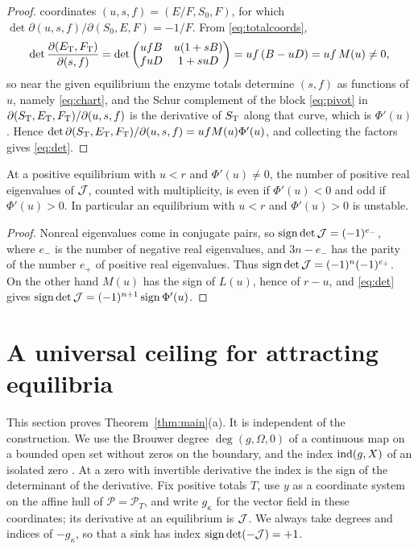 \begin{proof}
coordinates \((u,s,f)=(E/F,S_0,F)\), for which
\(\det\partial(u,s,f)/\partial(S_0,E,F)=-1/F\). From \eqref{eq:totalcoords},
\begin{equation}\label{eq:pivot}
 \det\frac{\partial(E_{\mathrm T},F_{\mathrm T})}{\partial(s,f)}
 =\det\begin{pmatrix}ufB&u(1+sB)\\ fuD&1+suD\end{pmatrix}=uf\,(B-uD)=uf\,M(u)\ne0,
\end{equation}
so near the given equilibrium the enzyme totals determine \((s,f)\) as functions of \(u\),
namely \eqref{eq:chart}, and the Schur complement of the block \eqref{eq:pivot} in
\(\partial(S_{\mathrm T},E_{\mathrm T},F_{\mathrm T})/\partial(u,s,f)\) is the derivative of \(S_{\mathrm T}\) along that curve, which
is \(\Phi'(u)\). Hence \(\det\partial(S_{\mathrm T},E_{\mathrm T},F_{\mathrm T})/\partial(u,s,f)=ufM(u)\Phi'(u)\), and
collecting the factors gives \eqref{eq:det}.
\end{proof}

\begin{corollary}\label{cor:parity}
At a positive equilibrium with \(u<r\) and \(\Phi'(u)\ne0\), the number of positive real
eigenvalues of \(\mathcal J\), counted with multiplicity, is even if \(\Phi'(u)<0\) and odd if
\(\Phi'(u)>0\). In particular an equilibrium with \(u<r\) and \(\Phi'(u)>0\) is unstable.
\end{corollary}
\begin{proof}
Nonreal eigenvalues come in conjugate pairs, so \(\operatorname{sign}\det\mathcal J=(-1)^{e_-}\), where \(e_-\) is the
number of negative real eigenvalues, and \(3n-e_-\) has the parity of the number \(e_+\) of
positive real eigenvalues. Thus \(\operatorname{sign}\det\mathcal J=(-1)^{n}(-1)^{e_+}\). On the other hand
\(M(u)\) has the sign of \(L(u)\), hence of \(r-u\), and \eqref{eq:det} gives
\(\operatorname{sign}\det\mathcal J=(-1)^{n+1}\operatorname{sign}\Phi'(u)\).
\end{proof}

\section{A universal ceiling for attracting equilibria}\label{sec:ceiling}
This section proves Theorem~\ref{thm:main}(a). It is independent of the construction. We use
the Brouwer degree \(\deg(g,\Omega,0)\) of a continuous map on a bounded open set without zeros
on the boundary, and the index \(\operatorname{ind}(g,X)\) of an isolated zero \cite{Deimling,KrasnoselskiiZabreiko}.
At a zero with invertible derivative the index is the sign of the determinant of the
derivative. Fix positive totals \(T\), use \(y\) as a coordinate system on the affine hull of
\(\mathcal P=\mathcal P_T\), and write \(g_\kappa\) for the vector field in these coordinates;
its derivative at an equilibrium is \(\mathcal J\). We always take degrees and indices of \(-g_\kappa\),
so that a sink has index \(\operatorname{sign}\det(-\mathcal J)=+1\).

